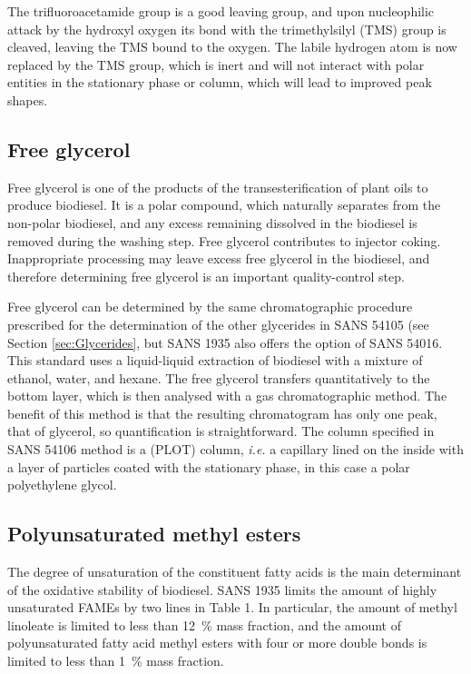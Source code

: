 The trifluoroacetamide group is a good leaving group, and upon nucleophilic
attack by the hydroxyl oxygen its bond with the trimethylsilyl (TMS) group is cleaved,
leaving the TMS bound to the oxygen. The labile hydrogen atom is now replaced by
the TMS group, which is inert and will not interact with polar entities in the
stationary phase or column, which will lead to improved peak shapes. 

\subsection{Free glycerol}

Free glycerol is one of the products of the transesterification of plant oils to
produce biodiesel. It is a polar compound, which naturally separates from
the non-polar biodiesel, and any excess remaining dissolved in the biodiesel is
removed during the washing step. Free glycerol contributes to injector coking.
Inappropriate processing may leave excess free glycerol in the biodiesel, and
therefore determining free glycerol is an important quality-control step.

Free glycerol can be determined by the same chromatographic procedure prescribed
for the determination of the other glycerides in SANS 54105 (see Section
\ref{sec:Glycerides}, but SANS 1935 also offers the option of SANS 54016. This
standard uses a liquid-liquid extraction of biodiesel with a mixture of ethanol,
water, and hexane. The free glycerol transfers quantitatively to the bottom
layer, which is then analysed with a gas chromatographic method. The benefit of
this method is that the resulting chromatogram has only one peak, that of
glycerol, so quantification is straightforward. The column specified in SANS
54106 method is a  (PLOT) column,
\textit{i.e.} a capillary lined on the inside with a layer of particles coated
with the stationary phase, in this case a polar polyethylene glycol.

\subsection{Polyunsaturated methyl esters}
\label{sec:ChromDetUnsat}

The degree of unsaturation of the constituent fatty acids is the main
determinant of the oxidative stability of biodiesel. SANS 1935 limits the amount
of highly unsaturated FAMEs by two lines in Table 1. In particular, the amount
of methyl linoleate is limited to less than \SI{12}{\percent} mass fraction, and
the amount of polyunsaturated fatty acid methyl esters with four or more double
bonds is limited to less than \SI{1}{\percent} mass fraction.

